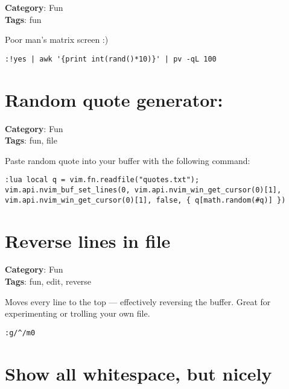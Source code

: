 {{{{{\textbf{Category}: Fun\\ \textbf{Tags}: fun
\vspace{0.5cm}

Poor man's matrix screen :)

\begin{Exa*}{}
\begin{Verbatim}[fontsize=\footnotesize, breaklines, breakanywhere]
:!yes | awk '{print int(rand()*10)}' | pv -qL 100
\end{Verbatim}
\end{Exa*}

\section{Random quote generator:}

\textbf{Category}: Fun\\ \textbf{Tags}: fun, file
\vspace{0.5cm}

Paste random quote into your buffer with the following command:

\begin{Exa*}{}
\begin{Verbatim}[fontsize=\footnotesize, breaklines, breakanywhere]
:lua local q = vim.fn.readfile("quotes.txt"); vim.api.nvim_buf_set_lines(0, vim.api.nvim_win_get_cursor(0)[1], vim.api.nvim_win_get_cursor(0)[1], false, { q[math.random(#q)] })
\end{Verbatim}
\end{Exa*}

\section{Reverse lines in file}

\textbf{Category}: Fun\\ \textbf{Tags}: fun, edit, reverse
\vspace{0.5cm}

Moves every line to the top — effectively reversing the buffer. Great for experimenting or trolling your own file.

\begin{Exa*}{}
\begin{Verbatim}[fontsize=\footnotesize, breaklines, breakanywhere]
:g/^/m0
\end{Verbatim}
\end{Exa*}

\section{Show all whitespace, but nicely}

}}}}}
